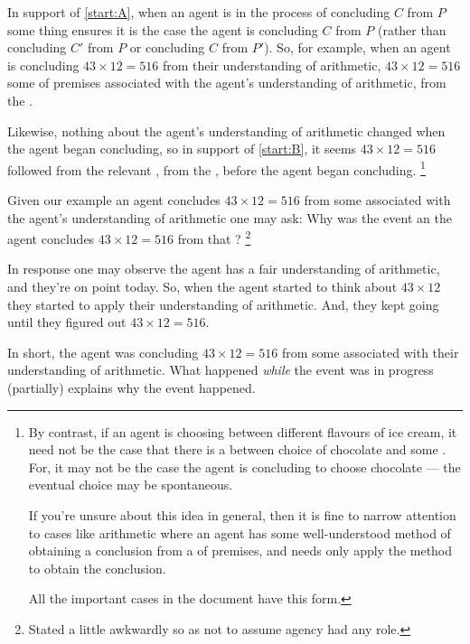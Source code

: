 \begin{note}
  In support of \ref{start:A}, when an agent is in the process of concluding \(C\) from \(P\) some thing ensures it is the case the agent is concluding \(C\) from \(P\) (rather than concluding \(C'\) from \(P\) or concluding \(C\) from \(P'\)).
  So, for example, when an agent is concluding \(43 \times 12 = 516\) from their understanding of arithmetic, \(43 \times 12 = 516\) \fof{} some \pool{} of premises associated with the agent's understanding of arithmetic, from the \agpe{}.

  Likewise, nothing about the agent's understanding of arithmetic changed when the agent began concluding, so in support of \ref{start:B}, it seems \(43 \times 12  = 516\) followed from the relevant \pool{}, from the \agpe{}, before the agent began concluding.%
  \footnote{
    By contrast, if an agent is choosing between different flavours of ice cream, it need not be the case that there is a \fingfr{} between choice of chocolate and some \pool{}.
    For, it may not be the case the agent is concluding to choose chocolate  --- the eventual choice may be spontaneous.

    If you're unsure about this idea in general, then it is fine to narrow attention to cases like arithmetic where an agent has some well-understood method of obtaining a conclusion from a \pool{} of premises, and needs only apply the method to obtain the conclusion.

    All the important cases in the document have this form.
  }
\end{note}


\begin{note}
  Given our example \eiw{} an agent concludes \(43 \times 12 = 516\) from some \pool{} associated with the agent's understanding of arithmetic one may ask:
  Why was the event an \eiw{} the agent concludes \(43 \times 12 = 516\) from that \pool{}?%
  \footnote{
    Stated a little awkwardly so as not to assume agency had any role.
  }

  In response one may observe the agent has a fair understanding of arithmetic, and they're on point today.
  So, when the agent started to think about \(43 \times 12\) they started to apply their understanding of arithmetic.
  And, they kept going until they figured out \(43 \times 12 = 516\).

  In short, the agent was concluding \(43 \times 12 = 516\) from some \pool{} associated with their understanding of arithmetic.
  What happened \emph{while} the event was in progress (partially) explains why the event happened.
\end{note}


